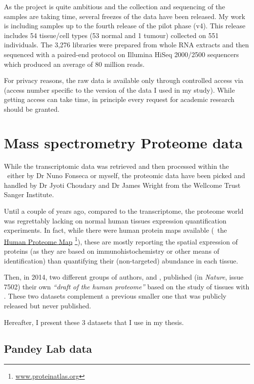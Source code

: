 As the project is quite ambitious and the collection and sequencing of the samples
are taking time, several freezes of the data have been released. My work is
including samples up to the fourth release of the pilot phase (v4). This
release includes 54 tissue/cell types (53 normal and 1 tumour)
collected on 551 individuals.
The 3,276 libraries were prepared from whole \gls{RNA} extracts and then sequenced
with a paired-end protocol on Illumina HiSeq 2000/2500 sequencers which produced
an average of 80 million reads.

For privacy reasons, the raw data is available only through controlled access via
 (access number specific to the version of the data I used
in my study). While getting access can take time, in principle every request for
academic research should be granted.

\section{Mass spectrometry Proteome data}

While the transcriptomic data was retrieved and then processed within the \EBI\
either by Dr Nuno Fonseca or myself, the proteomic data have been picked and
handled by Dr Jyoti Choudary and Dr James Wright from the Wellcome Trust
Sanger Institute.

Until a couple of years ago, compared to the transcriptome, the proteome world
was regrettably lacking on normal human tissues expression quantification
experiments. In fact, while there were human protein maps available
(\eg\ the \href{www.proteinatlas}{Human Proteome Map}%
\footnote{\href{http://www.proteinatlas.org}{www.proteinatlas.org}}), these
are mostly reporting the spatial expression of proteins (as they are based
on immunohistochemistry or other means of identification) than quantifying
their (non-targeted) abundance in each tissue.

Then, in 2014, two different groups of authors, \cite{PandeyData}
and \cite{KusterData}, published (in \textit{Nature},
issue 7502) their own \emph{``draft of the human proteome''}
based on the study of tissues with \ms. These two datasets complement a previous
smaller one that was publicly released but never published.

Hereafter, I present these 3 datasets that I use in my thesis.

\subsection{Pandey Lab data}

